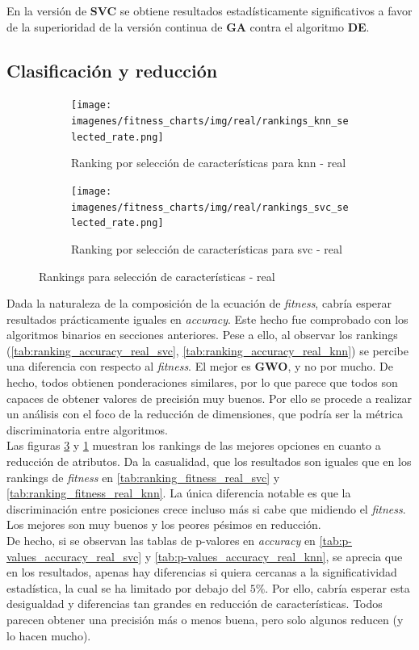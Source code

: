 En la versión de \textbf{SVC} se obtiene resultados estadísticamente significativos a favor de la superioridad de la versión continua de \textbf{GA} contra el algoritmo \textbf{DE}.

\subsection{Clasificación y reducción}

\begin{figure}[htp]
    \centering
    \begin{subfigure}[htp]{1\textwidth}
        \texttt{[image: imagenes/fitness\_charts/img/real/rankings\_knn\_selected\_rate.png]}
        \caption{Ranking por selección de características para knn - real}
        \label{fig:ranking_knn_real_sel_rate}
    \end{subfigure}
    \begin{subfigure}[htp]{1\textwidth}
        \texttt{[image: imagenes/fitness\_charts/img/real/rankings\_svc\_selected\_rate.png]}
        \caption{Ranking por selección de características para svc - real}
        \label{fig:ranking_svc_real_sel_rate}
    \end{subfigure}
    \caption{Rankings para selección de características - real}
\end{figure}

Dada la naturaleza de la composición de la ecuación de \textit{fitness}, cabría esperar resultados prácticamente iguales en \textit{accuracy}. Este hecho fue comprobado con los algoritmos binarios en secciones anteriores. Pese a ello, al observar los rankings (\ref{tab:ranking_accuracy_real_svc}, \ref{tab:ranking_accuracy_real_knn}) se percibe una diferencia con respecto al \textit{fitness}. El mejor es \textbf{GWO}, y no por mucho. De hecho, todos obtienen ponderaciones similares, por lo que parece que todos son capaces de obtener valores de precisión muy buenos. Por ello se procede a realizar un análisis con el foco de la reducción de dimensiones, que podría ser la métrica discriminatoria entre algoritmos.\\[6pt]
Las figuras \ref{fig:ranking_svc_real_sel_rate} y \ref{fig:ranking_knn_real_sel_rate} muestran los rankings de las mejores opciones en cuanto a reducción de atributos. Da la casualidad, que los resultados son iguales que en los rankings de \textit{fitness} en \ref{tab:ranking_fitness_real_svc} y \ref{tab:ranking_fitness_real_knn}. La única diferencia notable es que la discriminación entre posiciones crece incluso más si cabe que midiendo el \textit{fitness}. Los mejores son muy buenos y los peores pésimos en reducción.\\[6pt]
De hecho, si se observan las tablas de p-valores en \textit{accuracy} en \ref{tab:p-values_accuracy_real_svc} y \ref{tab:p-values_accuracy_real_knn}, se aprecia que en los resultados, apenas hay diferencias si quiera cercanas a la significatividad estadística, la cual se ha limitado por debajo del $5\%$. Por ello, cabría esperar esta desigualdad y diferencias tan grandes en reducción de características. Todos parecen obtener una precisión más o menos buena, pero solo algunos reducen (y lo hacen mucho).

